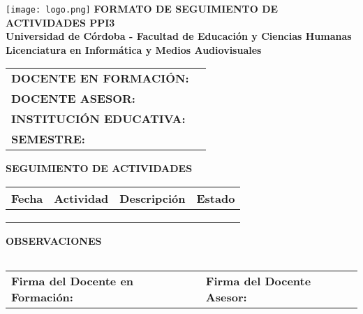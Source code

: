 \documentclass[a4paper,12pt]{article}
\begin{document}
\begin{center}
    \vspace*{1cm}
    \texttt{[image: logo.png]} %
    \vspace{0.5cm}
    \textbf{\Large FORMATO DE SEGUIMIENTO DE ACTIVIDADES PPI3} \\
    \vspace{0.5cm}
    \textbf{Universidad de Córdoba - Facultad de Educación y Ciencias Humanas} \\
    \textbf{Licenciatura en Informática y Medios Audiovisuales}
\end{center}

\vspace{0.5cm}
\begin{tabularx}{\textwidth}{@{}p{5cm}X@{}}
    \toprule
    \textbf{DOCENTE EN FORMACIÓN:} & \hrulefill \\
    \textbf{DOCENTE ASESOR:} & \hrulefill \\
    \textbf{INSTITUCIÓN EDUCATIVA:} & \hrulefill \\
    \textbf{SEMESTRE:} & \hrulefill \\
    \bottomrule
\end{tabularx}

\vspace{0.5cm}
\noindent
\textbf{SEGUIMIENTO DE ACTIVIDADES}
\begin{table}[h]
    \centering
    \scriptsize
    \begin{tabularx}{\textwidth}{|c|X|X|c|}
        \hline
        \textbf{Fecha} & \textbf{Actividad} & \textbf{Descripción} & \textbf{Estado} \\
        \hline
        & & & \\ \hline
        & & & \\ \hline
        & & & \\ \hline
    \end{tabularx}
\end{table}

\vspace{0.5cm}
\noindent
\textbf{OBSERVACIONES}
\begin{tabularx}{\textwidth}{|X|}
    \hline
    \vspace{3cm} \\ \hline
\end{tabularx}

\vspace{0.5cm}
\begin{center}
    \begin{tabular}{p{7cm}p{7cm}}
        \hline
        \textbf{Firma del Docente en Formación:} \hrulefill & \textbf{Firma del Docente Asesor:} \hrulefill \\
    \end{tabular}
\end{center}
\end{document}
